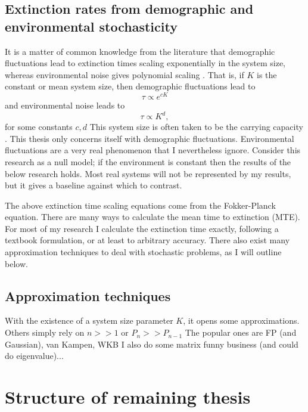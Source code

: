 \subsection{Extinction rates from demographic and environmental stochasticity}
It is a matter of common knowledge from the literature that demographic fluctuations lead to extinction times scaling exponentially in the system size, whereas environmental noise gives polynomial scaling \cite{Ovaskainen20X6}. 
That is, if $K$ is the constant or mean system size, then demographic fluctuations lead to
\begin{equation*}
\tau \propto e^{cK}
\end{equation*}
and environmental noise leads to
\begin{equation*}
\tau \propto K^d,
\end{equation*}
for some constants $c,d$
This system size is often taken to be the carrying capacity \cite{um...}. 
This thesis only concerns itself with demographic fluctuations. 
Environmental fluctuations are a very real phenomenon that I nevertheless ignore. 
Consider this research as a null model; if the environment is constant then the results of the below research holds. 
Most real systems will not be represented by my results, but it gives a baseline against which to contrast. 

The above extinction time scaling equations come from the Fokker-Planck equation. 
There are many ways to calculate the mean time to extinction (MTE). 
For most of my research I calculate the extinction time exactly, following a textbook formulation, or at least to arbitrary accuracy. 
There also exist many approximation techniques to deal with stochastic problems, as I will outline below. 


\subsection{Approximation techniques}

With the existence of a system size parameter $K$, it opens some approximations. 
Others simply rely on $n>>1$ or $P_n>>P_{n-1}$
The popular ones are FP (and Gaussian), van Kampen, WKB
I also do some matrix funny business (and could do eigenvalue)...




\section{Structure of remaining thesis}

